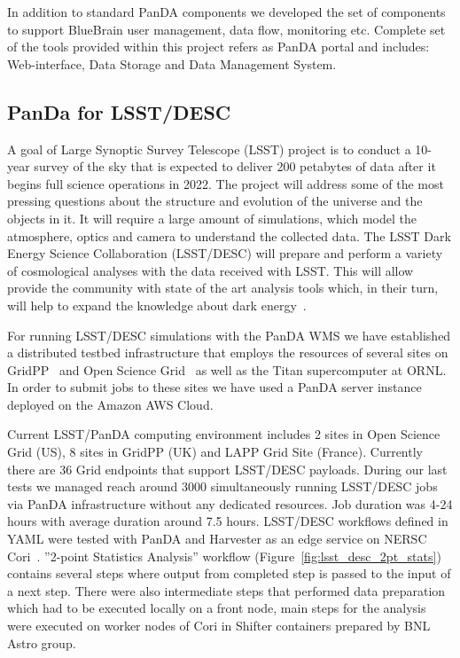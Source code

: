 \documentclass{webofc}
\begin{document}
In addition to standard PanDA components we developed the set of components to support BlueBrain user management, data flow, monitoring etc. Complete set of the tools provided within this project refers as PanDA portal and includes: Web-interface, Data Storage and Data Management System. 


\subsection{PanDa for LSST/DESC} \label{section_lsst_desc}

A goal of Large Synoptic Survey Telescope (LSST) project is to conduct a 10-year survey of the sky that is expected to deliver 200 petabytes of data after it begins full science operations in 2022. The project will address some of the most pressing questions about the structure and evolution of the universe and the objects in it. It will require a large amount of simulations, which model the atmosphere, optics and camera to understand the collected data. The LSST Dark Energy Science Collaboration (LSST/DESC) will prepare and perform a variety of cosmological analyses with the data received with LSST. This will allow provide the community with state of the art analysis tools which, in their turn, will help to expand the knowledge about dark energy~\cite{lsst-desc}.

For running LSST/DESC simulations with the PanDA WMS we have established a distributed testbed infrastructure that employs the resources of several sites on GridPP~\cite{GridPP_Collaboration_2005} and Open Science Grid~\cite{Pordes_2007} as well as the Titan supercomputer at ORNL. In order to submit jobs to these sites we have used a PanDA server instance deployed on the Amazon AWS Cloud. 

Current LSST/PanDA computing environment includes 2 sites in Open Science Grid (US), 8 sites in GridPP (UK) and LAPP Grid Site (France). Currently there are 36 Grid endpoints that support LSST/DESC payloads. During our last tests we managed reach around 3000 simultaneously running LSST/DESC jobs via PanDA infrastructure without any dedicated resources. 
Job duration was 4-24 hours with average duration around 7.5 hours.
LSST/DESC workflows defined in YAML were tested with PanDA and Harvester as an edge service on NERSC Cori~\cite{NERSC_Cori}. ''2-point Statistics Analysis'' workflow (Figure~\ref{fig:lsst_desc_2pt_stats}) contains several steps where output from completed step is passed to the input of a next step. There were also intermediate steps that performed data preparation which had to be executed locally on a front node, main steps for the analysis were executed on worker nodes of Cori in Shifter containers prepared by BNL Astro group.
\end{document}
